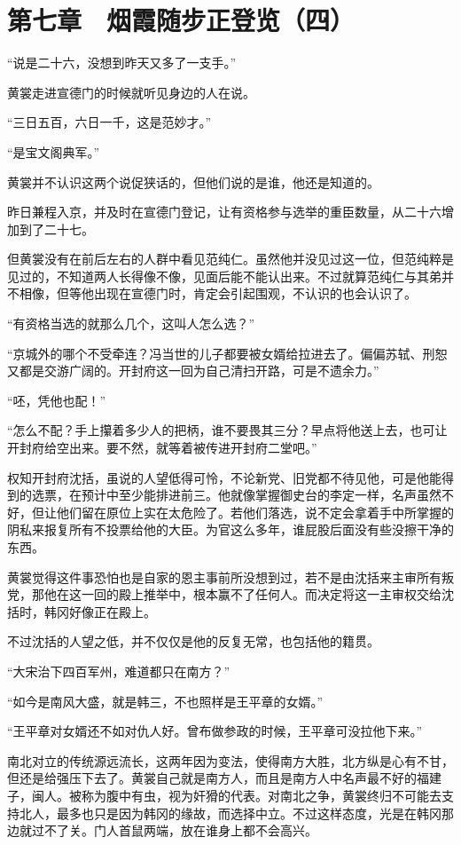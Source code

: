 \section{第七章　烟霞随步正登览（四）}

“说是二十六，没想到昨天又多了一支手。”

黄裳走进宣德门的时候就听见身边的人在说。

“三日五百，六日一千，这是范妙才。”

“是宝文阁典军。”

黄裳并不认识这两个说促狭话的，但他们说的是谁，他还是知道的。

昨日兼程入京，并及时在宣德门登记，让有资格参与选举的重臣数量，从二十六增加到了二十七。

但黄裳没有在前后左右的人群中看见范纯仁。虽然他并没见过这一位，但范纯粹是见过的，不知道两人长得像不像，见面后能不能认出来。不过就算范纯仁与其弟并不相像，但等他出现在宣德门时，肯定会引起围观，不认识的也会认识了。

“有资格当选的就那么几个，这叫人怎么选？”

“京城外的哪个不受牵连？冯当世的儿子都要被女婿给拉进去了。偏偏苏轼、刑恕又都是交游广阔的。开封府这一回为自己清扫开路，可是不遗余力。”

“呸，凭他也配！”

“怎么不配？手上攥着多少人的把柄，谁不要畏其三分？早点将他送上去，也可让开封府给空出来。要不然，就等着被传进开封府二堂吧。”

权知开封府沈括，虽说的人望低得可怜，不论新党、旧党都不待见他，可是他能得到的选票，在预计中至少能排进前三。他就像掌握御史台的李定一样，名声虽然不好，但让他们留在原位上实在太危险了。若他们落选，说不定会拿着手中所掌握的阴私来报复所有不投票给他的大臣。为官这么多年，谁屁股后面没有些没擦干净的东西。

黄裳觉得这件事恐怕也是自家的恩主事前所没想到过，若不是由沈括来主审所有叛党，那他在这一回的殿上推举中，根本赢不了任何人。而决定将这一主审权交给沈括时，韩冈好像正在殿上。

不过沈括的人望之低，并不仅仅是他的反复无常，也包括他的籍贯。

“大宋治下四百军州，难道都只在南方？”

“如今是南风大盛，就是韩三，不也照样是王平章的女婿。”

“王平章对女婿还不如对仇人好。曾布做参政的时候，王平章可没拉他下来。”

南北对立的传统源远流长，这两年因为变法，使得南方大胜，北方纵是心有不甘，但还是给强压下去了。黄裳自己就是南方人，而且是南方人中名声最不好的福建子，闽人。被称为腹中有虫，视为奸猾的代表。对南北之争，黄裳终归不可能去支持北人，最多也只是因为韩冈的缘故，而选择中立。不过这样态度，光是在韩冈那边就过不了关。门人首鼠两端，放在谁身上都不会高兴。

